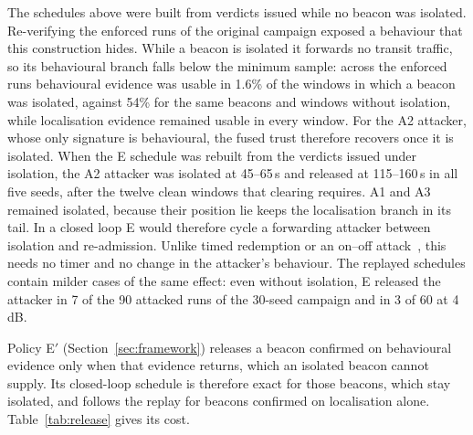 The schedules above were built from verdicts issued while no beacon was
isolated. Re-verifying the enforced runs of the original campaign exposed a
behaviour that this construction hides. While a beacon is isolated it
forwards no transit traffic, so its behavioural branch falls below the
minimum sample: across the enforced runs behavioural evidence was usable in
1.6\% of the windows in which a beacon was isolated, against 54\% for the same
beacons and windows without isolation, while localisation evidence remained
usable in every window. For the A2 attacker, whose only signature is
behavioural, the fused trust therefore recovers once it is isolated. When the
E schedule was rebuilt from the verdicts issued under isolation, the A2
attacker was isolated at 45--65\,s and released at 115--160\,s in all five
seeds, after the twelve clean windows that clearing requires. A1 and A3
remained isolated, because their position lie keeps the localisation branch
in its tail. In a closed loop E would therefore cycle a forwarding attacker
between isolation and re-admission. Unlike timed redemption or an on--off
attack~\cite{bansal2003ocean,sun2006attacks}, this needs no timer and no
change in the attacker's behaviour. The replayed schedules contain milder
cases of the same effect: even without isolation, E released the attacker in
7 of the 90 attacked runs of the 30-seed campaign and in 3 of 60 at 4\,dB.

Policy E$'$ (Section~\ref{sec:framework}) releases a beacon confirmed on
behavioural evidence only when that evidence returns, which an isolated
beacon cannot supply. Its closed-loop schedule is therefore exact for those
beacons, which stay isolated, and follows the replay for beacons confirmed on
localisation alone. Table~\ref{tab:release} gives its cost.

